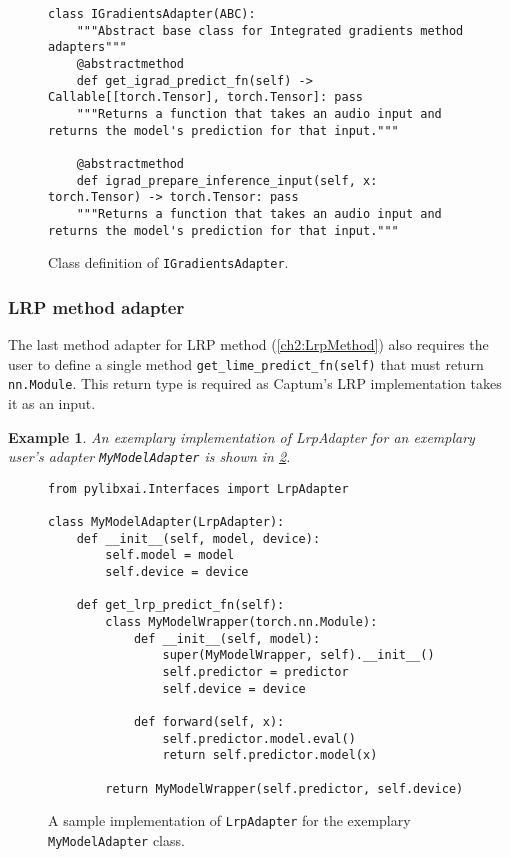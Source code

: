 \documentclass[
    bindingoffset=5mm,  %
    footnoteindent=3mm, %
    hyphenation=true    %
]{src/wut-thesis}
\newtheorem{example}{Example}
\begin{document}
\begin{figure}%
\begin{verbatim}
class IGradientsAdapter(ABC):
    """Abstract base class for Integrated gradients method adapters"""
    @abstractmethod
    def get_igrad_predict_fn(self) -> Callable[[torch.Tensor], torch.Tensor]: pass
    """Returns a function that takes an audio input and returns the model's prediction for that input."""

    @abstractmethod
    def igrad_prepare_inference_input(self, x: torch.Tensor) -> torch.Tensor: pass
    """Returns a function that takes an audio input and returns the model's prediction for that input."""
\end{verbatim}
\caption{Class definition of \texttt{IGradientsAdapter}.}
\label{fig:IGradientsAdapter}
\end{figure}

\subsubsection{LRP method adapter}

    The last method adapter for LRP method (\ref{ch2:LrpMethod}) also requires the user to define a single method \texttt{get_lime_predict_fn(self)} that must return \texttt{nn.Module}. This return type is required as Captum's LRP implementation takes it as an input.

    \begin{example}
        An exemplary implementation of LrpAdapter for an exemplary user's adapter \texttt{MyModelAdapter}
        is shown in \ref{fig:UserAdapterExample}.
    \end{example}

\begin{figure}%
\begin{verbatim}
from pylibxai.Interfaces import LrpAdapter

class MyModelAdapter(LrpAdapter):
    def __init__(self, model, device):
        self.model = model
        self.device = device

    def get_lrp_predict_fn(self):
        class MyModelWrapper(torch.nn.Module):
            def __init__(self, model):
                super(MyModelWrapper, self).__init__()
                self.predictor = predictor
                self.device = device

            def forward(self, x):
                self.predictor.model.eval()
                return self.predictor.model(x)

        return MyModelWrapper(self.predictor, self.device)
\end{verbatim}
\caption{A sample implementation of \texttt{LrpAdapter} for the exemplary \texttt{MyModelAdapter} class.}
\label{fig:UserAdapterExample}
\end{figure}
\end{document}
